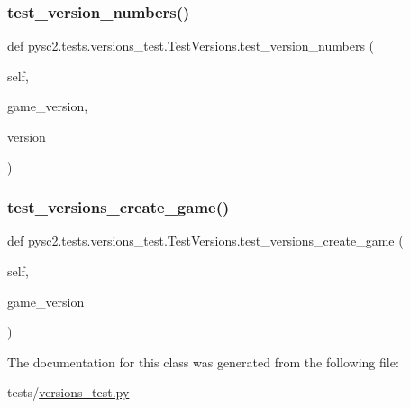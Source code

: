\subsubsection{\texorpdfstring{test\+\_\+version\+\_\+numbers()}{test\_version\_numbers()}}
{\footnotesize\ttfamily def pysc2.\+tests.\+versions\+\_\+test.\+Test\+Versions.\+test\+\_\+version\+\_\+numbers (\begin{DoxyParamCaption}\item[{}]{self,  }\item[{}]{game\+\_\+version,  }\item[{}]{version }\end{DoxyParamCaption})}

\mbox{\label{classpysc2_1_1tests_1_1versions__test_1_1_test_versions_a55ee9f281b391b975b80e4f91efabbd9}} 
\subsubsection{\texorpdfstring{test\+\_\+versions\+\_\+create\+\_\+game()}{test\_versions\_create\_game()}}
{\footnotesize\ttfamily def pysc2.\+tests.\+versions\+\_\+test.\+Test\+Versions.\+test\+\_\+versions\+\_\+create\+\_\+game (\begin{DoxyParamCaption}\item[{}]{self,  }\item[{}]{game\+\_\+version }\end{DoxyParamCaption})}



The documentation for this class was generated from the following file\+:\begin{DoxyCompactItemize}
\item 
tests/\mbox{\hyperlink{versions__test_8py}{versions\+\_\+test.\+py}}\end{DoxyCompactItemize}
